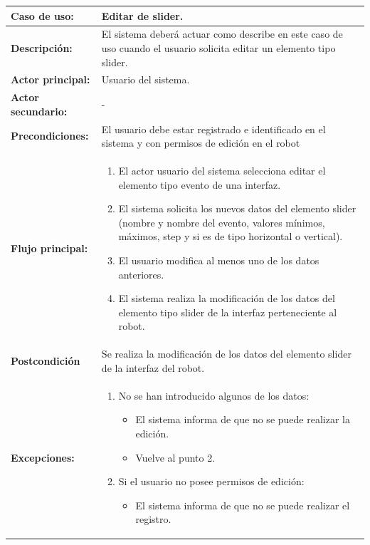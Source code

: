 \begin{table}[H]
  \begin{center}
    \begin{tabular}{|p{3.5cm}|p{10cm}|}
      \hline
      {\textbf{Caso de uso:}} & { Editar de slider.} \\
      \hline
      {\textbf{Descripción:}} & { El sistema deberá actuar como describe en este caso de uso cuando el usuario solicita editar un elemento tipo slider.} \\
     \hline
      {\textbf{Actor principal:}} & { Usuario del sistema.} \\
      \hline
      {\textbf{Actor secundario:}} & { - } \\
      \hline
      {\textbf{Precondiciones:}} & { El usuario debe estar registrado e identificado en el sistema y con permisos de edición en el robot} \\
     \hline   
    {\textbf{Flujo principal:}} & { 
      \begin{enumerate}
	\item El actor usuario del sistema selecciona editar el elemento tipo evento de una interfaz.
	\item El sistema solicita los nuevos datos del elemento slider (nombre y nombre del evento, valores mínimos, máximos, step y si es de tipo horizontal o vertical).
	\item El usuario modifica al menos uno de los datos anteriores.
	\item El sistema realiza la modificación de los datos del elemento tipo slider de la interfaz perteneciente al robot.
      \end{enumerate}
      } \\
     \hline
     {\textbf{Postcondición}} & {Se realiza la modificación de los datos del elemento slider de la interfaz del robot.}\\
     \hline
      {\textbf{Excepciones:}} & {
	\begin{enumerate}
	\item No se han introducido algunos de los datos:
	\begin{itemize}
	  \item El sistema informa de que no se puede realizar la edición.
	  \item Vuelve al punto 2.
	\end{itemize}
	\item Si el usuario no posee permisos de edición:
	  \begin{itemize}
	    \item El sistema informa de que no se puede realizar el registro.

\end{itemize}
\end{enumerate}}
\end{tabular}
\end{center}
\end{table}
